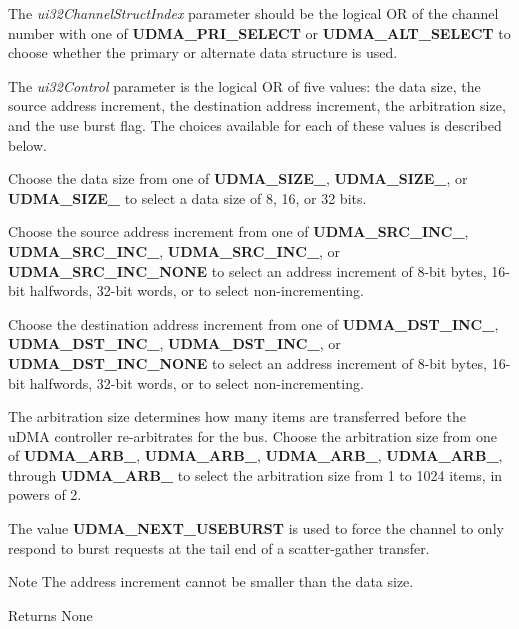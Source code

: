 The {\itshape ui32\+Channel\+Struct\+Index} parameter should be the logical OR of the channel number with one of {\bfseries U\+D\+M\+A\+\_\+\+P\+R\+I\+\_\+\+S\+E\+L\+E\+CT} or {\bfseries U\+D\+M\+A\+\_\+\+A\+L\+T\+\_\+\+S\+E\+L\+E\+CT} to choose whether the primary or alternate data structure is used.

The {\itshape ui32\+Control} parameter is the logical OR of five values\+: the data size, the source address increment, the destination address increment, the arbitration size, and the use burst flag. The choices available for each of these values is described below.

Choose the data size from one of {\bfseries U\+D\+M\+A\+\_\+\+S\+I\+Z\+E\+\_}, {\bfseries U\+D\+M\+A\+\_\+\+S\+I\+Z\+E\+\_}, or {\bfseries U\+D\+M\+A\+\_\+\+S\+I\+Z\+E\+\_} to select a data size of 8, 16, or 32 bits.

Choose the source address increment from one of {\bfseries U\+D\+M\+A\+\_\+\+S\+R\+C\+\_\+\+I\+N\+C\+\_}, {\bfseries U\+D\+M\+A\+\_\+\+S\+R\+C\+\_\+\+I\+N\+C\+\_}, {\bfseries U\+D\+M\+A\+\_\+\+S\+R\+C\+\_\+\+I\+N\+C\+\_}, or {\bfseries U\+D\+M\+A\+\_\+\+S\+R\+C\+\_\+\+I\+N\+C\+\_\+\+N\+O\+NE} to select an address increment of 8-\/bit bytes, 16-\/bit halfwords, 32-\/bit words, or to select non-\/incrementing.

Choose the destination address increment from one of {\bfseries U\+D\+M\+A\+\_\+\+D\+S\+T\+\_\+\+I\+N\+C\+\_}, {\bfseries U\+D\+M\+A\+\_\+\+D\+S\+T\+\_\+\+I\+N\+C\+\_}, {\bfseries U\+D\+M\+A\+\_\+\+D\+S\+T\+\_\+\+I\+N\+C\+\_}, or {\bfseries U\+D\+M\+A\+\_\+\+D\+S\+T\+\_\+\+I\+N\+C\+\_\+\+N\+O\+NE} to select an address increment of 8-\/bit bytes, 16-\/bit halfwords, 32-\/bit words, or to select non-\/incrementing.

The arbitration size determines how many items are transferred before the u\+D\+MA controller re-\/arbitrates for the bus. Choose the arbitration size from one of {\bfseries U\+D\+M\+A\+\_\+\+A\+R\+B\+\_}, {\bfseries U\+D\+M\+A\+\_\+\+A\+R\+B\+\_}, {\bfseries U\+D\+M\+A\+\_\+\+A\+R\+B\+\_}, {\bfseries U\+D\+M\+A\+\_\+\+A\+R\+B\+\_}, through {\bfseries U\+D\+M\+A\+\_\+\+A\+R\+B\+\_} to select the arbitration size from 1 to 1024 items, in powers of 2.

The value {\bfseries U\+D\+M\+A\+\_\+\+N\+E\+X\+T\+\_\+\+U\+S\+E\+B\+U\+R\+ST} is used to force the channel to only respond to burst requests at the tail end of a scatter-\/gather transfer.

\begin{DoxyNote}{Note}
The address increment cannot be smaller than the data size.
\end{DoxyNote}
\begin{DoxyReturn}{Returns}
None 
\end{DoxyReturn}


